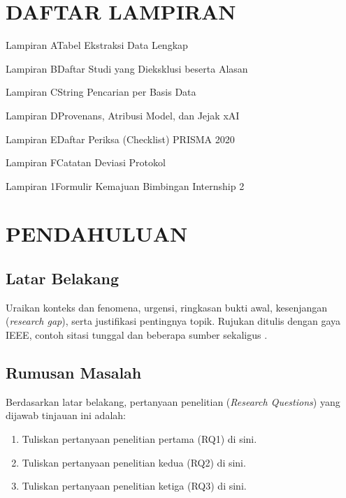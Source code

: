 \documentclass[12pt,a4paper,oneside]{report}
\newcommand{\mulaiisi}{%
  \clearpage
  \setcounter{chapter}{0}%
  \renewcommand{\thepage}{\Roman{chapter}-\arabic{page}}%
}
\begin{document}
\chapter*{DAFTAR LAMPIRAN}
\begin{description}[leftmargin=0pt,labelindent=0pt,itemsep=2pt]
  \item[] Lampiran A\quad Tabel Ekstraksi Data Lengkap
  \item[] Lampiran B\quad Daftar Studi yang Dieksklusi beserta Alasan
  \item[] Lampiran C\quad String Pencarian per Basis Data
  \item[] Lampiran D\quad Provenans, Atribusi Model, dan Jejak xAI
  \item[] Lampiran E\quad Daftar Periksa (Checklist) PRISMA 2020
  \item[] Lampiran F\quad Catatan Deviasi Protokol
  \item[] Lampiran 1\quad Formulir Kemajuan Bimbingan Internship 2
\end{description}

\mulaiisi

\chapter{PENDAHULUAN}\justifying

\section{Latar Belakang}
Uraikan konteks dan fenomena, urgensi, ringkasan bukti awal, kesenjangan
(\textit{research gap}), serta justifikasi pentingnya topik. Rujukan ditulis
dengan gaya IEEE, contoh sitasi tunggal \cite{contoh1} dan beberapa sumber
sekaligus \cite{contoh1,contoh2}.

\section{Rumusan Masalah}
Berdasarkan latar belakang, pertanyaan penelitian (\textit{Research Questions})
yang dijawab tinjauan ini adalah:
\begin{enumerate}[label=\textbf{RQ\arabic*.}, leftmargin=*, itemsep=2pt]
  \item Tuliskan pertanyaan penelitian pertama (RQ1) di sini.
  \item Tuliskan pertanyaan penelitian kedua (RQ2) di sini.
  \item Tuliskan pertanyaan penelitian ketiga (RQ3) di sini.
\end{enumerate}
\end{document}
